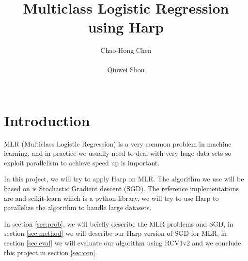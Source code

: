 \documentclass{sig-alternate-05-2015}
\begin{document}

\title{Multiclass Logistic Regression using Harp}
\author{
  \alignauthor Chao-Hong Chen\\
  \\
  \alignauthor Qiuwei Shou\\
  \\
}
\makeatletter
\def\@copyrightspace{\relax}
\makeatother
\maketitle

\section{Introduction}
MLR (Multiclass Logistic Regression) is a very common problem in machine learning,
and in practice we usually need to deal with very huge data sets so exploit parallelism
to achieve speed up is important.\par
In this project, we will try to apply Harp\cite{harp} on MLR.
The algorithm we use will be based on is Stochastic Gradient descent (SGD).
The reference implementations are \cite{logistic-regression} and scikit-learn\cite{scikit-learn} which is a python library,
we will try to use Harp to parallelize the algorithm to handle large datasets.\par
In section \ref{sec:prob}, we will beiefly describe the MLR problems and SGD,
in section \ref{sec:method} we will describe our Harp version of SGD for MLR,
in section \ref{sec:eval} we will evaluate our algorithm using RCV1v2\cite{Lewis:2004:RNB:1005332.1005345}
and we conclude this project in section \ref{sec:con}.
\end{document}
